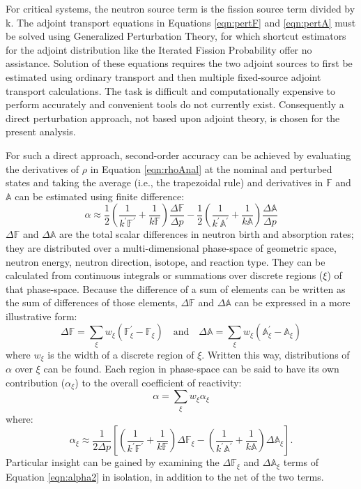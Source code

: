\documentclass[11pt]{article}
\newcommand{\A}[0]{\mathbb{A}}
\newcommand{\F}[0]{\mathbb{F}}
\begin{document}
For critical systems, the neutron source term is the fission source term divided by k.
The adjoint transport equations in Equations \ref{eqn:pertF} and \ref{eqn:pertA} must be solved using Generalized Perturbation Theory, for which shortcut estimators for the adjoint distribution like the Iterated Fission Probability \cite[864-869]{henry1964nk} offer no assistance.
Solution of these equations requires the two adjoint sources to first be estimated using ordinary transport and then multiple fixed-source adjoint transport calculations.
The task is difficult and computationally expensive to perform accurately and convenient tools do not currently exist.
Consequently a direct perturbation approach, not based upon adjoint theory, is chosen for the present analysis.

For such a direct approach, second-order accuracy can be achieved by evaluating the derivatives of $\rho$ in Equation \ref{eqn:rhoAnal} at the nominal and perturbed states and taking the average (i.e., the trapezoidal rule) and derivatives in $\F$ and $\A$ can be estimated using finite difference:
\begin{equation}
    \alpha \approx \frac{1}{2} \left(\frac{1}{k^\prime \F^\prime} + \frac{1}{k\F}\right)\frac{\Delta \F}{\Delta p} - \frac{1}{2} \left(\frac{1}{k^\prime \A^\prime} + \frac{1}{k\A}\right)\frac{\Delta \A}{\Delta p}
\end{equation}
$\Delta\F$ and $\Delta\A$ are the total scalar differences in neutron birth and absorption rates; they are distributed over a multi-dimensional phase-space of geometric space, neutron energy, neutron direction, isotope, and reaction type.
They can be calculated from continuous integrals or summations over discrete regions ($\xi$) of that phase-space.
Because the difference of a sum of elements can be written as the sum of differences of those elements, $\Delta\F$ and $\Delta\A$ can be expressed in a more illustrative form:
\begin{equation}
    \Delta \F = \sum_\xi w_\xi \left(\F_\xi^\prime - \F_\xi \right) \quad \mathrm{and} \quad \Delta \A = \sum_\xi w_\xi \left(\A_\xi^\prime - \A_\xi\right)
\end{equation}
where $w_\xi$ is the width of a discrete region of $\xi$.
Written this way, distributions of $\alpha$ over $\xi$ can be found.
Each region in phase-space can be said to have its own contribution ($\alpha_\xi$) to the overall coefficient of reactivity:
\begin{equation}
    \alpha = \sum_\xi w_\xi \alpha_\xi
\end{equation}
where:
\begin{equation}
    \alpha_\xi \approx \frac{1}{2 \Delta p} \left[\left(\frac{1}{k^\prime \F^\prime} + \frac{1}{k\F}\right)\Delta \F_\xi - \left(\frac{1}{k^\prime \A^\prime} + \frac{1}{k\A}\right)\Delta \A_\xi \right].
    \label{eqn:alpha2}
\end{equation}
Particular insight can be gained by examining the $\Delta \F_\xi$ and $\Delta \A_\xi$ terms of Equation \ref{eqn:alpha2} in isolation, in addition to the net of the two terms.
\end{document}
